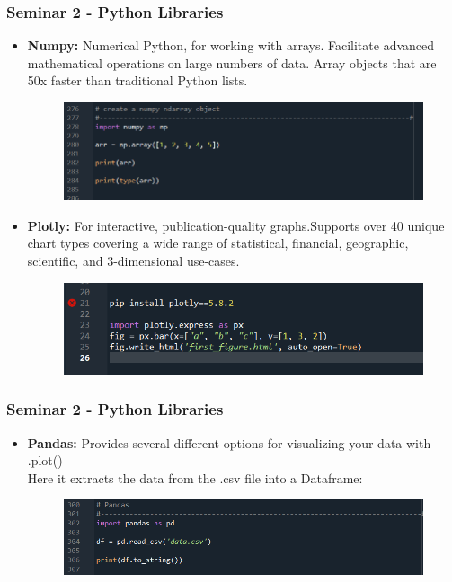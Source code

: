 \documentclass{beamer}
\begin{document}
\begin{frame}[fragile]
\frametitle{Seminar 2 - Python Libraries}
\begin{itemize}

    \item \textbf{Numpy:}\newline
    Numerical Python, for working with arrays.
    Facilitate advanced mathematical operations on large numbers of data.\newline
    Array objects that are 50x faster than traditional Python lists.
        \begin{figure}
        \includegraphics[width=0.65\linewidth]{Seminar_2_images/Python/numpy.png}
        \end{figure}

    \item \textbf{Plotly:}\newline
    For interactive, publication-quality graphs.Supports over 40 unique chart types covering a wide range of statistical, financial, geographic, scientific, and 3-dimensional use-cases.
        \begin{figure}
        \includegraphics[width=0.65\linewidth]{Seminar_2_images/Python/b py 9.png}
        \end{figure}
\end{itemize}
\end{frame}

\begin{frame}[fragile]
\frametitle{Seminar 2 - Python Libraries}
\begin{itemize}
       \item \textbf{Pandas:}\newline
       Provides several different options for visualizing your data with .plot()\\
       Here it extracts the data from the .csv file into a Dataframe:
        \begin{figure}
        \includegraphics[width=1\linewidth]{Seminar_2_images/Python/pandas.png}
        \end{figure}
\end{itemize}
\end{frame}
\end{document}
